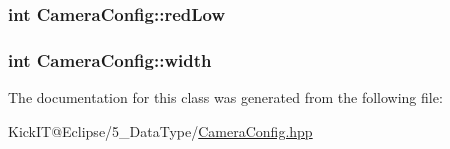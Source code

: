 \subsubsection[{\texorpdfstring{red\+Low}{redLow}}]{\setlength{\rightskip}{0pt plus 5cm}int Camera\+Config\+::red\+Low}\hypertarget{class_camera_config_af17574ff4f72c58e893b999969be99a5}{}\label{class_camera_config_af17574ff4f72c58e893b999969be99a5}
\subsubsection[{\texorpdfstring{width}{width}}]{\setlength{\rightskip}{0pt plus 5cm}int Camera\+Config\+::width}\hypertarget{class_camera_config_a96696c7f5168a06e31f46bef172d60d1}{}\label{class_camera_config_a96696c7f5168a06e31f46bef172d60d1}


The documentation for this class was generated from the following file\+:\begin{DoxyCompactItemize}
\item 
Kick\+I\+T@\+Eclipse/5\+\_\+\+Data\+Type/\hyperlink{_camera_config_8hpp}{Camera\+Config.\+hpp}\end{DoxyCompactItemize}
